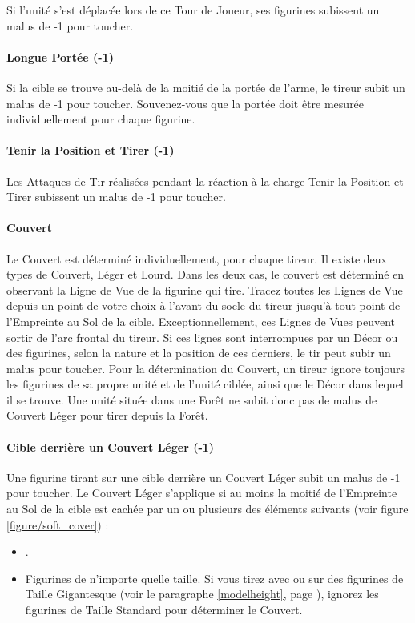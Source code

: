 Si l'unité s'est déplacée lors de ce Tour de Joueur, ses figurines subissent un malus de -1 pour toucher.

\paragraph{Longue Portée (-1)}

Si la cible se trouve au-delà de la moitié de la portée de l'arme, le tireur subit un malus de -1 pour toucher. Souvenez-vous que la portée doit être mesurée individuellement pour chaque figurine.

\paragraph{Tenir la Position et Tirer (-1)}

Les Attaques de Tir réalisées pendant la réaction à la charge Tenir la Position et Tirer subissent un malus de -1 pour toucher.

\paragraph{Couvert}

Le Couvert est déterminé individuellement, pour chaque tireur. Il existe deux types de Couvert, Léger et Lourd. Dans les deux cas, le couvert est déterminé en observant la Ligne de Vue de la figurine qui tire. Tracez toutes les Lignes de Vue depuis un point de votre choix à l'avant du socle du tireur jusqu'à tout point de l'Empreinte au Sol de la cible. Exceptionnellement, ces Lignes de Vues peuvent sortir de l'arc frontal du tireur. Si ces lignes sont interrompues par un Décor ou des figurines, selon la nature et la position de ces derniers, le tir peut subir un malus pour toucher. Pour la détermination du Couvert, un tireur ignore toujours les figurines de sa propre unité et de l'unité ciblée, ainsi que le Décor dans lequel il se trouve. Une unité située dans une Forêt ne subit donc pas de malus de Couvert Léger pour tirer depuis la Forêt.

\newpage
\paragraph{Cible derrière un Couvert Léger (-1)}

Une figurine tirant sur une cible derrière un Couvert Léger subit un malus de -1 pour toucher. Le Couvert Léger s'applique si au moins la moitié de l'Empreinte au Sol de la cible est cachée par un ou plusieurs des éléments suivants (voir figure \ref{figure/soft_cover}) :
\begin{itemize}[label={-}]
\item \softterrain{}.
\item Figurines de n'importe quelle taille. Si vous tirez avec ou sur des figurines de Taille Gigantesque (voir le paragraphe \ref{modelheight}, page \pageref{modelheight}), ignorez les figurines de Taille Standard pour déterminer le Couvert.
\end{itemize}

